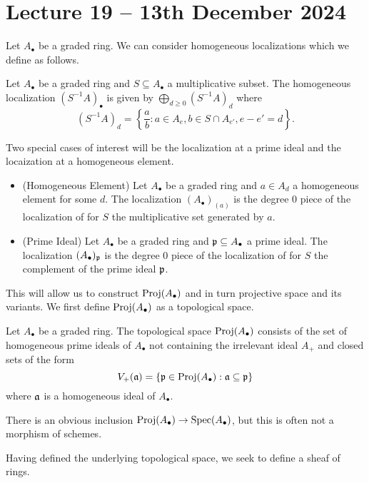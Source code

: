 \section{Lecture 19 -- 13th December 2024}\label{sec: lecture 19}
Let $A_{\bullet}$ be a graded ring. We can consider homogeneous localizations which we define as follows. 
\begin{definition}\label{def: homogeneous localization}
    Let $A_{\bullet}$ be a graded ring and $S\subseteq A_{\bullet}$ a multiplicative subset. The homogeneous localization $(S^{-1}A)_{\bullet}$ is given by $\bigoplus_{d\geq0}(S^{-1}A)_{d}$ where 
    $$(S^{-1}A)_{d}=\left\{\frac{a}{b}: a\in A_{e}, b\in S\cap A_{e'}, e-e'=d\right\}.$$
\end{definition}
Two special cases of interest will be the localization at a prime ideal and the locaization at a homogeneous element. 
\begin{itemize}
    \item (Homogeneous Element) Let $A_{\bullet}$ be a graded ring and $a\in A_{d}$ a homogeneous element for some $d$. The localization $(A_{\bullet})_{(a)}$ is the degree 0 piece of the localization of  for $S$ the multiplicative set generated by $a$.
    \item (Prime Ideal) Let $A_{\bullet}$ be a graded ring and $\mathfrak{p}\subseteq A_{\bullet}$ a prime ideal. The localization $(A_{\bullet})_{\mathfrak{p}}$ is the degree 0 piece of the localization of  for $S$ the complement of the prime ideal $\mathfrak{p}$. 
\end{itemize}
This will allow us to construct $\operatorname{Proj}(A_{\bullet})$ and in turn projective space and its variants. We first define $\operatorname{Proj}(A_{\bullet})$ as a topological space. 
\begin{definition}\label{def: proj space}
    Let $A_{\bullet}$ be a graded ring. The topological space $\operatorname{Proj}(A_{\bullet})$ consists of the set of homogeneous prime ideals of $A_{\bullet}$ not containing the irrelevant ideal $A_{+}$ and closed sets of the form 
    $$V_{+}(\mathfrak{a})=\{\mathfrak{p}\in\operatorname{Proj}(A_{\bullet}):\mathfrak{a}\subseteq\mathfrak{p}\}$$
    where $\mathfrak{a}$ is a homogeneous ideal of $A_{\bullet}$. 
\end{definition}
\begin{remark}
    There is an obvious inclusion $\operatorname{Proj}(A_{\bullet})\to\operatorname{Spec}(A_{\bullet})$, but this is often not a morphism of schemes. 
\end{remark}
Having defined the underlying topological space, we seek to define a sheaf of rings. 
